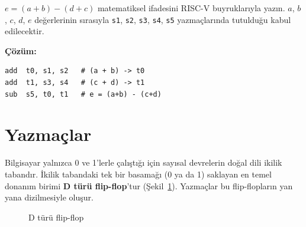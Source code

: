 \begin{ornek}[3.2]
$e = (a + b) - (d + c)$ matematiksel ifadesini RISC-V buyruklarıyla yazın. $a$, $b$, $c$, $d$, $e$ değerlerinin sırasıyla \texttt{s1}, \texttt{s2}, \texttt{s3}, \texttt{s4}, \texttt{s5} yazmaçlarında tutulduğu kabul edilecektir.

\textbf{Çözüm:}
\begin{lstlisting}[style=riscv]
add  t0, s1, s2   # (a + b) -> t0
add  t1, s3, s4   # (c + d) -> t1
sub  s5, t0, t1   # e = (a+b) - (c+d)
\end{lstlisting}
\end{ornek}


\section{Yazmaçlar}
\label{sec:yazmaclar}

Bilgisayar yalnızca 0 ve 1'lerle çalıştığı için sayısal devrelerin doğal dili ikilik tabandır. İkilik tabandaki tek bir basamağı (0 ya da 1) saklayan en temel donanım birimi \textbf{D türü flip-flop}'tur (Şekil~\ref{fig:d-flip-flop}). Yazmaçlar bu flip-flopların yan yana dizilmesiyle oluşur.

\begin{figure}[H]
\centering
{}
\caption{D türü flip-flop}
\label{fig:d-flip-flop}
\end{figure}

